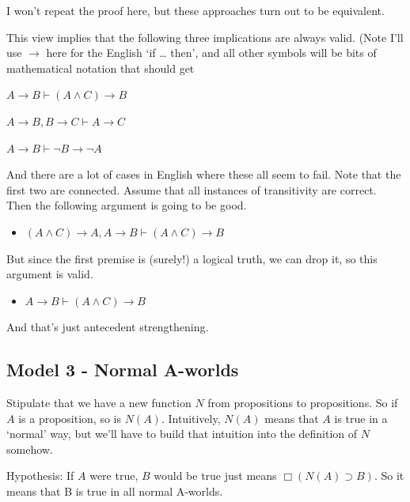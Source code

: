 \documentclass[
]{article}
\providecommand{\tightlist}{%
  \setlength{\itemsep}{0pt}\setlength{\parskip}{0pt}}\usepackage{longtable,booktabs,array}
\begin{document}
I won't repeat the proof here, but these approaches turn out to be
equivalent.

This view implies that the following three implications are always
valid. (Note I'll use \(\rightarrow\) here for the English `if \ldots{}
then', and all other symbols will be bits of mathematical notation that
should get

\begin{description}
\tightlist
\item[Antecedent Strengthening]
\(A \rightarrow B \vdash (A \wedge C) \rightarrow B\)
\item[Transitivity]
\(A \rightarrow B, B \rightarrow C \vdash A \rightarrow C\)
\item[Contraposition]
\(A \rightarrow B \vdash \neg B \rightarrow \neg A\)
\end{description}

And there are a lot of cases in English where these all seem to fail.
Note that the first two are connected. Assume that all instances of
transitivity are correct. Then the following argument is going to be
good.

\begin{itemize}
\tightlist
\item
  \((A \wedge C) \rightarrow A, A \rightarrow B \vdash (A \wedge C) \rightarrow B\)
\end{itemize}

But since the first premise is (surely!) a logical truth, we can drop
it, so this argument is valid.

\begin{itemize}
\tightlist
\item
  \(A \rightarrow B \vdash (A \wedge C) \rightarrow B\)
\end{itemize}

And that's just antecedent strengthening.

\hypertarget{model-3---normal-a-worlds}{%
\subsection{Model 3 - Normal A-worlds}\label{model-3---normal-a-worlds}}

Stipulate that we have a new function \(N\) from propositions to
propositions. So if \(A\) is a proposition, so is \(N(A)\). Intuitively,
\(N(A)\) means that \(A\) is true in a `normal' way, but we'll have to
build that intuition into the definition of \(N\) somehow.

Hypothesis: If \(A\) were true, \(B\) would be true just means
\(\Box(N(A) \supset B)\). So it means that B is true in all normal
A-worlds.
\end{document}
